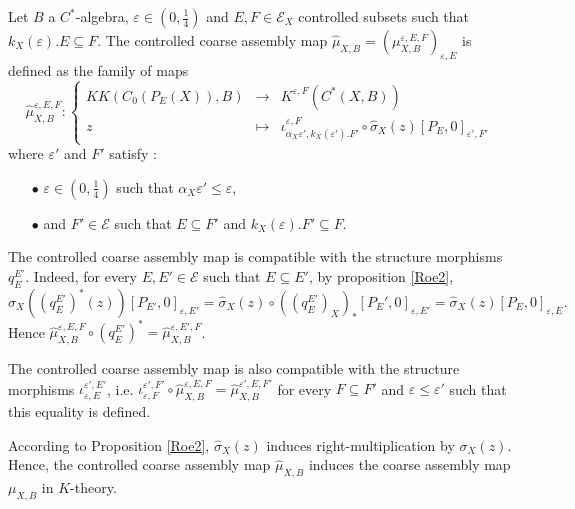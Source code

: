 \begin{definition}
Let $B$ a $C^*$-algebra, $\varepsilon\in (0,\frac{1}{4})$ and $E,F\in\mathcal E_X$ controlled subsets such that $k_X(\varepsilon).E\subseteq F$. The controlled coarse assembly map $\hat\mu_{X,B}=(\mu_{X,B}^{\varepsilon,E,F})_{\varepsilon,E}$ is defined as the family of maps
\[\hat\mu_{X,B}^{\varepsilon, E,F} :\left\{\begin{array}{rcl} KK(C_0(P_E(X)),B) & \rightarrow & K^{\varepsilon, F}(C^*(X,B)) \\
					z & \mapsto & \iota_{\alpha_X \varepsilon',k_X(\varepsilon').F'}^{\varepsilon,F}\circ\hat\sigma_X(z)[P_{E},0]_{\varepsilon', F'}\end{array}\right.\]
where $\varepsilon'$ and $F'$ satisfy :
\begin{itemize}
\item[$\bullet$] $\varepsilon\in (0,\frac{1}{4})$ such that $\alpha_X \varepsilon'\leq \varepsilon$,
\item[$\bullet$] and $F'\in\mathcal E$ such that $E\subseteq F'$ and $k_X(\varepsilon).F'\subseteq F$.
\end{itemize}
\end{definition}

\begin{rk} The controlled coarse assembly map is compatible with the structure morphisms $q_E^{E'}$. Indeed, for every $E,E'\in \mathcal E$ such that $E\subseteq E'$, by proposition \ref{Roe2}, 
\[\hat\sigma_X((q_E^{E'})^*(z))[P_{E'},0]_{\varepsilon,E'}  = \hat\sigma_X(z)\circ ((q_E^{E'})_X)_*[P_E',0]_{\varepsilon,E'}= \hat\sigma_X(z)[P_E,0]_{\varepsilon,E}.\] 
Hence $\hat\mu_{X,B}^{\varepsilon,E,F}\circ(q_E^{E'})^* =\hat\mu_{X,B}^{\varepsilon,E',F}$.
\end{rk}

\begin{rk} The controlled coarse assembly map is also compatible with the structure morphisms $\iota_{\varepsilon,E}^{\varepsilon',E'}$, i.e. $\iota_{\varepsilon,F}^{\varepsilon',F'}\circ\hat\mu_{X,B}^{\varepsilon,E,F} =\hat\mu_{X,B}^{\varepsilon',E,F'}$ for every $F\subseteq F'$ and $\varepsilon\leq \varepsilon'$ such that this equality is defined. 
\end{rk}

\begin{rk}According to Proposition \ref{Roe2}, $\hat\sigma_X(z)$ induces right-multiplication by $\sigma_X(z)$. Hence, the controlled coarse assembly map $\hat \mu_{X,B}$ induces the coarse assembly map $\mu_{X,B}$ in $K$-theory.
\end{rk}

